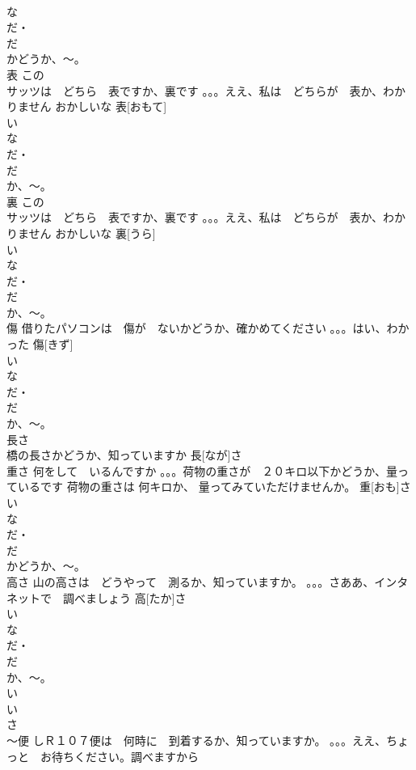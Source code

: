 \documentclass[8pt]{extreport}
\begin{document}
\begin{CJK}{UTF8}{min}
\\	な
\\	だ・
\\	だ 
\\	かどうか、～。
\\	表	この　
\\	サッツは　どちら　表ですか、裏です 。。。ええ、私は　どちらが　表か、わかりません おかしいな	表[おもて]			
\\	い　
\\	な
\\	だ・
\\	だ 
\\	か、～。
\\	裏	この　
\\	サッツは　どちら　表ですか、裏です 。。。ええ、私は　どちらが　表か、わかりません おかしいな	裏[うら]			
\\	い　
\\	な
\\	だ・
\\	だ 
\\	か、～。
\\	傷	借りたパソコンは　傷が　ないかどうか、確かめてください 。。。はい、わかった	傷[きず]			
\\	い　
\\	な
\\	だ・
\\	だ 
\\	か、～。
\\	長さ	
\\	橋の長さかどうか、知っていますか	長[なが]さ			
\\	重さ	何をして　いるんですか 。。。荷物の重さが　２０キロ以下かどうか、量っているです 荷物の重さは 何キロか、 量ってみていただけませんか。	重[おも]さ				
\\	い　
\\	な
\\	だ・
\\	だ 
\\	かどうか、～。
\\	高さ	山の高さは　どうやって　測るか、知っていますか。 。。。さああ、インタネットで　調べましょう	高[たか]さ				
\\	い　
\\	な
\\	だ・
\\	だ 
\\	か、～。
\\	い　
\\	い 
\\	さ　
\\	～便	しＲ１０７便は　何時に　到着するか、知っていますか。 。。。ええ、ちょっと　お待ちください。調べますから	

\end{CJK}
\end{document}
